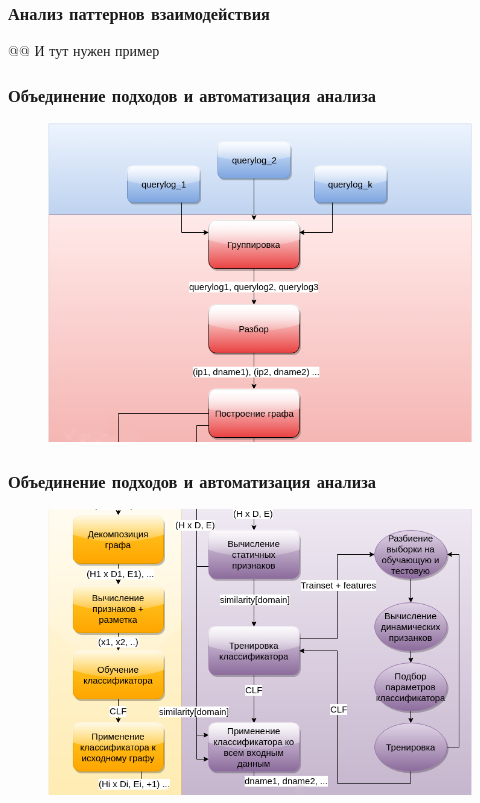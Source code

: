 \documentclass[10pt,pdf,hyperref={unicode}]{beamer}
\begin{document}
\begin{frame}
\frametitle{Анализ паттернов взаимодействия}
@@ И тут нужен пример
\end{frame}

\begin{frame}
\frametitle{Объединение подходов и автоматизация анализа}
\begin{figure}[H]
	\centering
	\includegraphics[scale=0.4]{schema-head.png}
\end{figure}
\end{frame}

\begin{frame}
\frametitle{Объединение подходов и автоматизация анализа}
\begin{figure}[H]
	\centering
	\includegraphics[scale=0.4]{schema-tail.png}
\end{figure}
\end{frame}
\end{document}
